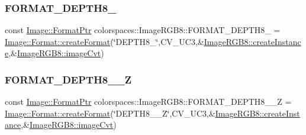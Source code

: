 \subsubsection{\texorpdfstring{F\+O\+R\+M\+A\+T\+\_\+\+D\+E\+P\+T\+H8\+\_}{FORMAT\_DEPTH8\_16}}
{\footnotesize\ttfamily const \hyperlink{classcolorspaces_1_1_image_ab3978cc7acc2b5e855f8c715f09667d1}{Image\+::\+Format\+Ptr} colorspaces\+::\+Image\+R\+G\+B8\+::\+F\+O\+R\+M\+A\+T\+\_\+\+D\+E\+P\+T\+H8\+\_ = \hyperlink{classcolorspaces_1_1_image_1_1_format_ae79208f237b72cf596331ebcec2ff58b}{Image\+::\+Format\+::create\+Format}(\char`\"{}D\+E\+P\+T\+H8\+\_\char`\"{},C\+V\+\_\+U\+C3,\&\hyperlink{classcolorspaces_1_1_image_r_g_b8_ab71cd6e6837845cd0c43ac03e3a86297}{Image\+R\+G\+B8\+::create\+Instance},\&\hyperlink{classcolorspaces_1_1_image_r_g_b8_ac26f79bdedd29a4ab1ee6f9ac0abd928}{Image\+R\+G\+B8\+::image\+Cvt})\hspace{0.3cm}{\ttfamily [static]}}

\mbox{\label{classcolorspaces_1_1_image_r_g_b8_accd7299575ca7ba2e2c1f339c00fe102}} 
\subsubsection{\texorpdfstring{F\+O\+R\+M\+A\+T\+\_\+\+D\+E\+P\+T\+H8\+\_\+\_\+Z}{FORMAT\_DEPTH8\_16\_Z}}
{\footnotesize\ttfamily const \hyperlink{classcolorspaces_1_1_image_ab3978cc7acc2b5e855f8c715f09667d1}{Image\+::\+Format\+Ptr} colorspaces\+::\+Image\+R\+G\+B8\+::\+F\+O\+R\+M\+A\+T\+\_\+\+D\+E\+P\+T\+H8\+\_\+\_\+Z = \hyperlink{classcolorspaces_1_1_image_1_1_format_ae79208f237b72cf596331ebcec2ff58b}{Image\+::\+Format\+::create\+Format}(\char`\"{}D\+E\+P\+T\+H8\+\_\+\_\+Z\char`\"{},C\+V\+\_\+U\+C3,\&\hyperlink{classcolorspaces_1_1_image_r_g_b8_ab71cd6e6837845cd0c43ac03e3a86297}{Image\+R\+G\+B8\+::create\+Instance},\&\hyperlink{classcolorspaces_1_1_image_r_g_b8_ac26f79bdedd29a4ab1ee6f9ac0abd928}{Image\+R\+G\+B8\+::image\+Cvt})\hspace{0.3cm}{\ttfamily [static]}}

\mbox{\label{classcolorspaces_1_1_image_r_g_b8_abb2bd76934dd71bb401db29cd5082b5c}} 
